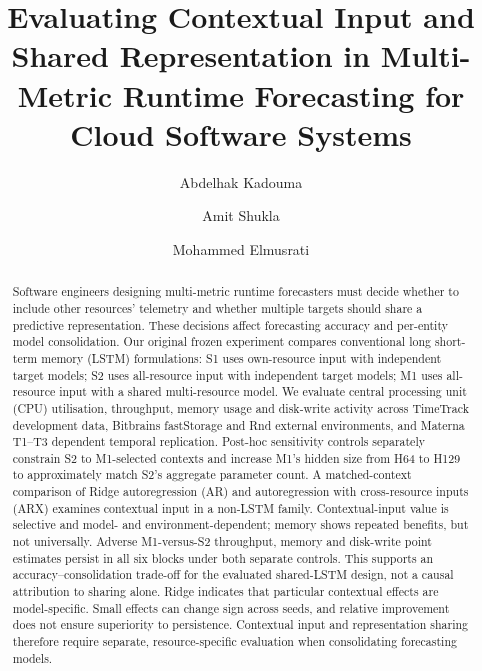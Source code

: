 \documentclass[a4paper,fleqn]{cas-dc}
\begin{document}

\title[mode=title]{Evaluating Contextual Input and Shared Representation in Multi-Metric Runtime Forecasting for Cloud Software Systems}

\author[1]{Abdelhak Kadouma}
\cormark[1]

\author[1]{Amit Shukla}

\author[1]{Mohammed Elmusrati}



\begin{abstract}
Software engineers designing multi-metric runtime forecasters must decide
whether to include other resources' telemetry and whether multiple targets
should share a predictive representation. These decisions affect forecasting
accuracy and per-entity model consolidation. Our original frozen experiment compares
conventional long short-term memory (LSTM) formulations: S1 uses own-resource
input with independent target models; S2 uses all-resource input with
independent target models; M1 uses all-resource input with a shared
multi-resource model. We evaluate central processing unit (CPU) utilisation, throughput, memory usage
and disk-write activity across TimeTrack development data, Bitbrains
fastStorage and Rnd external environments, and Materna T1--T3 dependent
temporal replication. Post-hoc sensitivity controls separately constrain S2
to M1-selected contexts and increase M1's hidden size from H64 to H129 to
approximately match S2's aggregate parameter count. A matched-context
comparison of Ridge autoregression (AR) and autoregression with cross-resource
inputs (ARX) examines contextual input in a non-LSTM family.
Contextual-input value is selective and model- and environment-dependent;
memory shows repeated benefits, but not universally. Adverse M1-versus-S2
throughput, memory and disk-write point estimates persist in all six blocks
under both separate controls. This supports an accuracy--consolidation
trade-off for the evaluated shared-LSTM design, not a causal attribution to
sharing alone. Ridge indicates that particular contextual effects are
model-specific. Small effects can change sign across seeds, and relative
improvement does not ensure superiority to persistence. Contextual input and
representation sharing therefore require separate, resource-specific
evaluation when consolidating forecasting models.
\end{abstract}
\end{document}
